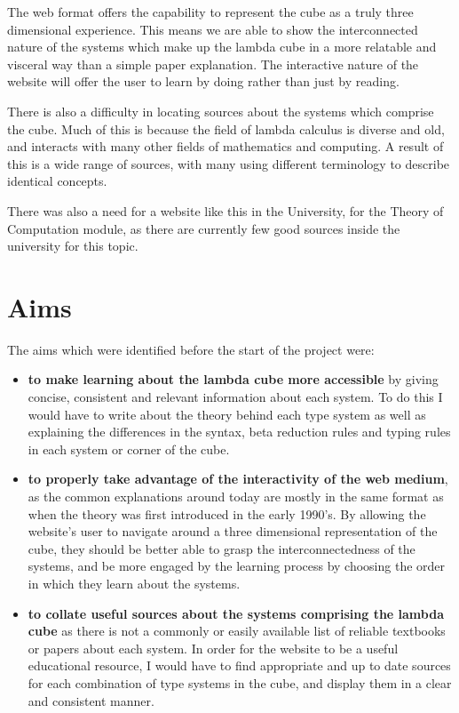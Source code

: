 \documentclass{l4proj}
\begin{document}
The web format offers the capability to represent the cube as a truly three dimensional experience. This means we are able to show the interconnected nature of the systems which make up the lambda cube in a more relatable and visceral way than a simple paper explanation.  The interactive nature of the website will offer the user to learn by doing rather than just by reading.

There is also a difficulty in locating sources about the systems which comprise the cube.  Much of this is because the field of lambda calculus is diverse and old, and interacts with many other fields of mathematics and computing.  A result of this is a wide range of sources, with many using different terminology to describe identical concepts.

There was also a need for a website like this in the University, for the Theory of Computation module, as there are currently few good sources inside the university for this topic.

\section{Aims}

The aims which were identified before the start of the project were: 
\begin{itemize}
    \item
    \textbf{to make learning about the lambda cube more accessible} by giving concise, consistent and relevant information about each system.  To do this I would have to write about the theory behind each type system as well as explaining the differences in the syntax, beta reduction rules and typing rules in each system or corner of the cube.

    \item
    \textbf{to properly take advantage of the interactivity of the web medium}, as the common explanations around today are mostly in the same format as when the theory was first introduced in the early 1990's.  By allowing the website's user to navigate around a three dimensional representation of the cube, they should be better able to grasp the interconnectedness of the systems, and be more engaged by the learning process by choosing the order in which they learn about the systems.

    \item
    \textbf{to collate useful sources about the systems comprising the lambda cube} as there is not a commonly or easily available list of reliable textbooks or papers about each system.  In order for the website to be a useful educational resource, I would have to find appropriate and up to date sources for each combination of type systems in the cube, and display them in a clear and consistent manner.
\end{itemize}
\end{document}

